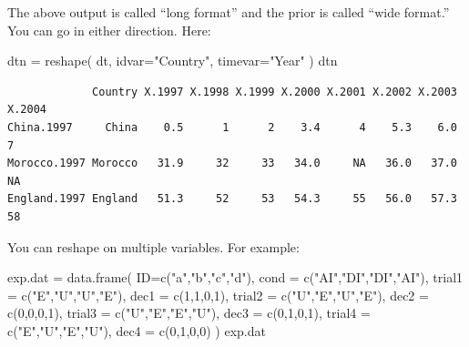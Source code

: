 \documentclass[
  letterpaper,
  DIV=11,
  numbers=noendperiod]{scrreprt}
\newenvironment{Shaded}{}{}
\newcommand{\AttributeTok}[1]{\textcolor[rgb]{0.49,0.56,0.16}{#1}}
\newcommand{\DecValTok}[1]{\textcolor[rgb]{0.25,0.63,0.44}{#1}}
\newcommand{\FunctionTok}[1]{\textcolor[rgb]{0.02,0.16,0.49}{#1}}
\newcommand{\NormalTok}[1]{#1}
\newcommand{\OtherTok}[1]{\textcolor[rgb]{0.00,0.44,0.13}{#1}}
\newcommand{\StringTok}[1]{\textcolor[rgb]{0.25,0.44,0.63}{#1}}
\begin{document}
The above output is called ``long format'' and the prior is called
``wide format.''\\
You can go in either direction. Here:

\begin{Shaded}
\begin{Highlighting}[]
\NormalTok{dtn }\OtherTok{=} \FunctionTok{reshape}\NormalTok{( dt, }\AttributeTok{idvar=}\StringTok{"Country"}\NormalTok{, }\AttributeTok{timevar=}\StringTok{"Year"}\NormalTok{ )}
\NormalTok{dtn}
\end{Highlighting}
\end{Shaded}

\begin{verbatim}
             Country X.1997 X.1998 X.1999 X.2000 X.2001 X.2002 X.2003 X.2004
China.1997     China    0.5      1      2    3.4      4    5.3    6.0      7
Morocco.1997 Morocco   31.9     32     33   34.0     NA   36.0   37.0     NA
England.1997 England   51.3     52     53   54.3     55   56.0   57.3     58
\end{verbatim}

You can reshape on multiple variables. For example:

\begin{Shaded}
\begin{Highlighting}[]
\NormalTok{exp.dat }\OtherTok{=} \FunctionTok{data.frame}\NormalTok{( }\AttributeTok{ID=}\FunctionTok{c}\NormalTok{(}\StringTok{"a"}\NormalTok{,}\StringTok{"b"}\NormalTok{,}\StringTok{"c"}\NormalTok{,}\StringTok{"d"}\NormalTok{), }
      \AttributeTok{cond =} \FunctionTok{c}\NormalTok{(}\StringTok{"AI"}\NormalTok{,}\StringTok{"DI"}\NormalTok{,}\StringTok{"DI"}\NormalTok{,}\StringTok{"AI"}\NormalTok{),}
            \AttributeTok{trial1 =} \FunctionTok{c}\NormalTok{(}\StringTok{"E"}\NormalTok{,}\StringTok{"U"}\NormalTok{,}\StringTok{"U"}\NormalTok{,}\StringTok{"E"}\NormalTok{),}
            \AttributeTok{dec1 =} \FunctionTok{c}\NormalTok{(}\DecValTok{1}\NormalTok{,}\DecValTok{1}\NormalTok{,}\DecValTok{0}\NormalTok{,}\DecValTok{1}\NormalTok{),}
            \AttributeTok{trial2 =} \FunctionTok{c}\NormalTok{(}\StringTok{"U"}\NormalTok{,}\StringTok{"E"}\NormalTok{,}\StringTok{"U"}\NormalTok{,}\StringTok{"E"}\NormalTok{),}
            \AttributeTok{dec2 =} \FunctionTok{c}\NormalTok{(}\DecValTok{0}\NormalTok{,}\DecValTok{0}\NormalTok{,}\DecValTok{0}\NormalTok{,}\DecValTok{1}\NormalTok{),}
                \AttributeTok{trial3 =} \FunctionTok{c}\NormalTok{(}\StringTok{"U"}\NormalTok{,}\StringTok{"E"}\NormalTok{,}\StringTok{"E"}\NormalTok{,}\StringTok{"U"}\NormalTok{),}
            \AttributeTok{dec3 =} \FunctionTok{c}\NormalTok{(}\DecValTok{0}\NormalTok{,}\DecValTok{1}\NormalTok{,}\DecValTok{0}\NormalTok{,}\DecValTok{1}\NormalTok{),}
                \AttributeTok{trial4 =} \FunctionTok{c}\NormalTok{(}\StringTok{"E"}\NormalTok{,}\StringTok{"U"}\NormalTok{,}\StringTok{"E"}\NormalTok{,}\StringTok{"U"}\NormalTok{),}
            \AttributeTok{dec4 =} \FunctionTok{c}\NormalTok{(}\DecValTok{0}\NormalTok{,}\DecValTok{1}\NormalTok{,}\DecValTok{0}\NormalTok{,}\DecValTok{0}\NormalTok{) )}
\NormalTok{exp.dat}
\end{Highlighting}
\end{Shaded}
\end{document}
